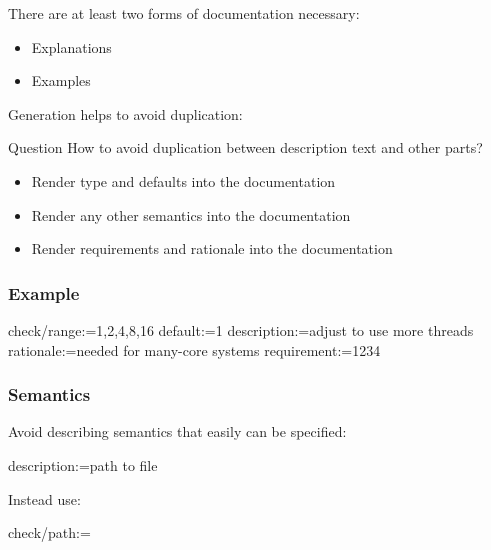 \begin{frame}
	There are at least two forms of documentation necessary:

	\begin{itemize}
	\item Explanations
	\item Examples
	\end{itemize}

	Generation helps to avoid duplication:

\end{frame}

\begin{frame}
	\begin{alertblock}{Question}
	How to avoid duplication between description text and other parts?
	\end{alertblock}

	\begin{itemize}
	\item Render type and defaults into the documentation
	\item Render any other semantics into the documentation
	\item Render requirements and rationale into the documentation
	\end{itemize}
\end{frame}

\begin{frame}[fragile]
	\frametitle{Example}

	\begin{code}
	  check/range:=1,2,4,8,16
	  default:=1
	  description:=adjust to use more threads
	  rationale:=needed for many-core systems
	  requirement:=1234
	\end{code}
\end{frame}

\begin{frame}[fragile]
	\frametitle{Semantics}

	Avoid describing semantics that easily can be specified:

	\begin{code}
	  description:=path to file
	\end{code}

	Instead use:

	\begin{code}
	  check/path:=
	\end{code}
\end{frame}


